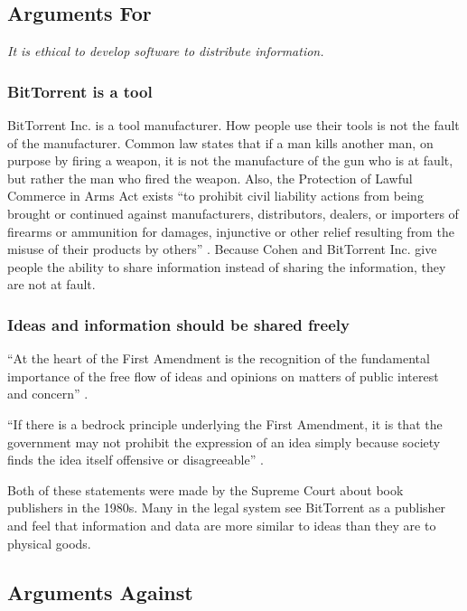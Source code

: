 \documentclass[11pt]{article}
\begin{document}
\begin{multicols}{2}
\subsection{Arguments For}

\textit{It is ethical to develop software to distribute information.}

\subsubsection{BitTorrent is a tool}
BitTorrent Inc. is a tool manufacturer. How people use their tools is not the fault of the manufacturer. Common law states that if a man kills another man, on purpose by firing a weapon, it is not the manufacture of the gun who is at fault, but rather the man who fired the weapon. Also, the Protection of Lawful Commerce in Arms Act exists ``to prohibit civil liability actions from being brought or continued against manufacturers, distributors, dealers, or importers of firearms or ammunition for damages, injunctive or other relief resulting from the misuse of their products by others'' \cite{firearms}. Because Cohen and BitTorrent Inc. give people the ability to share information instead of sharing the information, they are not at fault.

\subsubsection{Ideas and information should be shared freely}

``At the heart of the First Amendment is the recognition of the fundamental importance of the free flow of ideas and opinions on matters of public interest and concern'' \cite[51]{1988hustler}.

``If there is a bedrock principle underlying the First Amendment, it is that the government may not prohibit the expression of an idea simply because society finds the idea itself offensive or disagreeable'' \cite[414]{1989texas}.

Both of these statements were made by the Supreme Court about book publishers in the 1980s. Many in the legal system see BitTorrent as a publisher and feel that information and data are more similar to ideas than they are to physical goods.

\subsection{Arguments Against}


\end{multicols}
\end{document}
